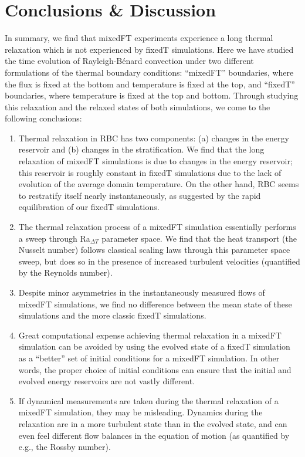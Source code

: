 \documentclass[aps, pre, onecolumn, nofootinbib, notitlepage, groupedaddress, amsfonts, amssymb, amsmath, longbibliography, superscriptaddress]{revtex4-1}
\newcommand{\RB}{Rayleigh-B\'{e}nard }
\begin{document}

\section{Conclusions \& Discussion}
\label{sec:discussion}
In summary, we find that mixedFT experiments experience a long thermal relaxation which is not experienced by fixedT simulations.
Here we have studied the time evolution of \RB convection under two different formulations of the thermal boundary conditions: ``mixedFT'' boundaries, where the flux is fixed at the bottom and temperature is fixed at the top, and ``fixedT'' boundaries, where temperature is fixed at the top and bottom.
Through studying this relaxation and the relaxed states of both simulations, we come to the following conclusions:
\begin{enumerate}
\item Thermal relaxation in RBC has two components: (a) changes in the energy reservoir and (b) changes in the stratification.
We find that the long relaxation of mixedFT simulations is due to changes in the energy reservoir; this reservoir is roughly constant in fixedT simulations due to the lack of evolution of the average domain temperature.
On the other hand, RBC seems to restratify itself nearly instantaneously, as suggested by the rapid equilibration of our fixedT simulations.
\item The thermal relaxation process of a mixedFT simulation essentially performs a sweep through Ra$_{\Delta T}$ parameter space.
We find that the heat transport (the Nusselt number) follows classical scaling laws through this parameter space sweep, but does so in the presence of increased turbulent velocities (quantified by the Reynolds number).
\item Despite minor asymmetries in the instantaneously measured flows of mixedFT simulations, we find no difference between the mean state of these simulations and the more classic fixedT simulations.
\item Great computational expense achieving thermal relaxation in a mixedFT simulation can be avoided by using the evolved state of a fixedT simulation as a ``better'' set of initial conditions for a mixedFT simulation.
In other words, the proper choice of initial conditions can ensure that the initial and evolved energy reservoirs are not vastly different.
\item If dynamical measurements are taken during the thermal relaxation of a mixedFT simulation, they may be misleading.
Dynamics during the relaxation are in a more turbulent state than in the evolved state, and can even feel different flow balances in the equation of motion (as quantified by e.g., the Rossby number).
\end{enumerate}
\end{document}
